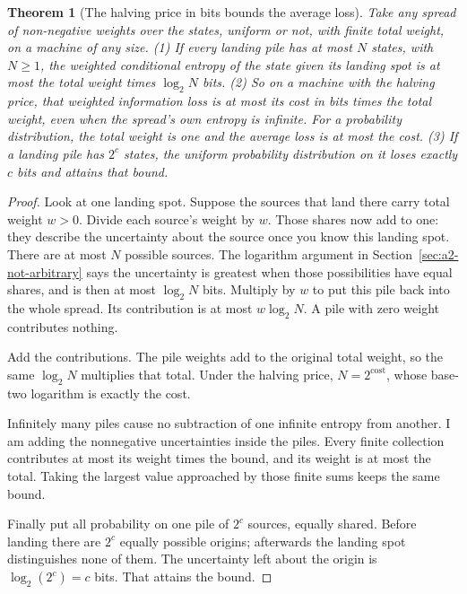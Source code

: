\documentclass[11pt,twoside]{article}
\theoremstyle{thielethm}
\newtheorem{theorem}{Theorem}[section]
\theoremstyle{thieledef}
\theoremstyle{thieledef}
\theoremstyle{thieledef}
\theoremstyle{thielethm}
\theoremstyle{thieleobs}
\theoremstyle{thielethm}
\begin{document}
\begin{theorem}[The halving price in bits bounds the average loss]\label{thm:dir-bits-loss}
Take any spread of non-negative weights over the states, uniform or not, with finite total weight, on a machine
of any size. (1) If every landing pile has at most $N$ states, with $N\ge1$, the weighted conditional entropy of
the state given its landing spot is at most the total weight times $\log_2 N$ bits. (2) So on a machine with the
halving price, that weighted information loss is at most its cost in bits times the total weight, even when the
spread's own entropy is infinite. For a probability distribution, the total weight is one and the average loss is
at most the cost. (3) If a landing pile has $2^c$ states, the uniform probability distribution on it loses exactly
$c$ bits and attains that bound.
\end{theorem}

\begin{proof}
Look at one landing spot. Suppose the sources that land there carry total
weight $w>0$. Divide each source's weight by $w$. Those shares now add to one:
they describe the uncertainty about the source once you know this landing spot.
There are at most $N$ possible sources. The logarithm argument in
Section~\ref{sec:a2-not-arbitrary} says the uncertainty is greatest when those
possibilities have equal shares, and is then at most $\log_2 N$ bits.
Multiply by $w$ to put this pile back into the whole spread. Its contribution
is at most $w\log_2 N$. A pile with zero weight contributes nothing.

Add the contributions. The pile weights add to the original total weight,
so the same $\log_2 N$ multiplies that total. Under the halving price,
$N=2^{\mathrm{cost}}$, whose base-two logarithm is exactly the cost.

Infinitely many piles cause no subtraction of one infinite entropy from
another. I am adding the nonnegative uncertainties inside the piles.
Every finite collection contributes at most its weight times the bound,
and its weight is at most the total. Taking the largest value approached
by those finite sums keeps the same bound.

Finally put all probability on one pile of $2^c$ sources, equally shared.
Before landing there are $2^c$ equally possible origins; afterwards the
landing spot distinguishes none of them. The uncertainty left about the
origin is $\log_2(2^c)=c$ bits. That attains the bound.
\end{proof}
\end{document}
